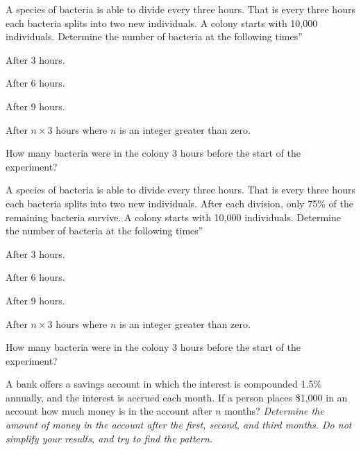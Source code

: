 \begin{problem}
\item A species of bacteria is able to divide every three hours. That
  is every three hours each bacteria splits into two new
  individuals. A colony starts with 10,000 individuals. Determine the
  number of bacteria at the following times''
  \begin{subproblem}
  \item After 3 hours.
    \vfill
  \item After 6 hours.
    \vfill
  \item After 9 hours.
    \vfill
  \item After $n\times 3$ hours where $n$ is an integer greater than zero.
    \vfill
  \item How many bacteria were in the colony 3 hours before the start
    of the experiment?
    \vfill
  \end{subproblem}

  \clearpage

\item A species of bacteria is able to divide every three hours. That
  is every three hours each bacteria splits into two new
  individuals. After each division, only 75\% of the remaining
  bacteria survive. A colony starts with 10,000 individuals. Determine
  the number of bacteria at the following times''
  \begin{subproblem}
  \item After 3 hours.
    \vfill
  \item After 6 hours.
    \vfill
  \item After 9 hours.
    \vfill
  \item After $n\times 3$ hours where $n$ is an integer greater than zero.
    \vfill
  \item How many bacteria were in the colony 3 hours before the start
    of the experiment?
    \vfill
  \end{subproblem}

  \clearpage

\item A bank offers a savings account in which the interest is
  compounded 1.5\% annually, and the interest is accrued each
  month. If a person places \$1,000 in an account how much money is in
  the account after $n$ months?
  \textit{Determine the amount of money in the account after the
    first, second, and third months. Do not simplify your results, and
  try to find the pattern.}


\end{problem}
